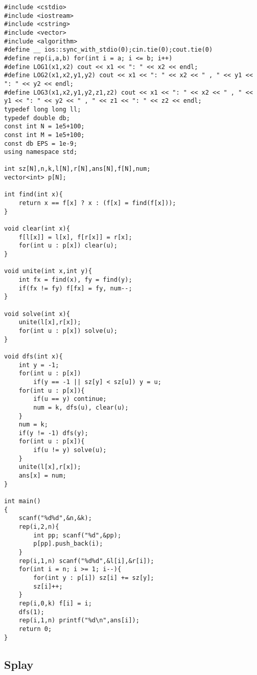 \documentclass[twoside]{article}
\begin{document}
\begin{lstlisting}
#include <cstdio>
#include <iostream>
#include <cstring>
#include <vector>
#include <algorithm>
#define __ ios::sync_with_stdio(0);cin.tie(0);cout.tie(0)
#define rep(i,a,b) for(int i = a; i <= b; i++)
#define LOG1(x1,x2) cout << x1 << ": " << x2 << endl;
#define LOG2(x1,x2,y1,y2) cout << x1 << ": " << x2 << " , " << y1 << ": " << y2 << endl;
#define LOG3(x1,x2,y1,y2,z1,z2) cout << x1 << ": " << x2 << " , " << y1 << ": " << y2 << " , " << z1 << ": " << z2 << endl;
typedef long long ll;
typedef double db;
const int N = 1e5+100;
const int M = 1e5+100;
const db EPS = 1e-9;
using namespace std;

int sz[N],n,k,l[N],r[N],ans[N],f[N],num;
vector<int> p[N];

int find(int x){
	return x == f[x] ? x : (f[x] = find(f[x]));
}

void clear(int x){
	f[l[x]] = l[x], f[r[x]] = r[x];
	for(int u : p[x]) clear(u);
}

void unite(int x,int y){
	int fx = find(x), fy = find(y);
	if(fx != fy) f[fx] = fy, num--;
}

void solve(int x){
	unite(l[x],r[x]);
	for(int u : p[x]) solve(u);
}

void dfs(int x){
	int y = -1;
	for(int u : p[x])
		if(y == -1 || sz[y] < sz[u]) y = u;
	for(int u : p[x]){
		if(u == y) continue;
		num = k, dfs(u), clear(u);
	}
	num = k;
	if(y != -1) dfs(y);
	for(int u : p[x]){
		if(u != y) solve(u);
	}
	unite(l[x],r[x]);
	ans[x] = num;
}

int main()
{
	scanf("%d%d",&n,&k);
	rep(i,2,n){
		int pp; scanf("%d",&pp);
		p[pp].push_back(i);
	}
	rep(i,1,n) scanf("%d%d",&l[i],&r[i]);
	for(int i = n; i >= 1; i--){
		for(int y : p[i]) sz[i] += sz[y];
		sz[i]++;
	}
	rep(i,0,k) f[i] = i;
	dfs(1);
	rep(i,1,n) printf("%d\n",ans[i]);
	return 0;
}
\end{lstlisting}
\subsection{Splay}
\end{document}
